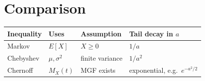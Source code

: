 \documentclass{article}
\begin{document}
\section*{Comparison}

\begin{center}
\renewcommand{\arraystretch}{1.3}
\begin{tabular}{llll}
\hline
Inequality & Uses & Assumption & Tail decay in $a$ \\
\hline
Markov    & $E[X]$        & $X \ge 0$         & $1/a$ \\
Chebyshev & $\mu, \sigma^2$ & finite variance & $1/a^2$ \\
Chernoff  & $M_X(t)$      & MGF exists        & exponential, e.g.\ $e^{-a^2/2}$ \\
\hline
\end{tabular}
\end{center}
\end{document}

